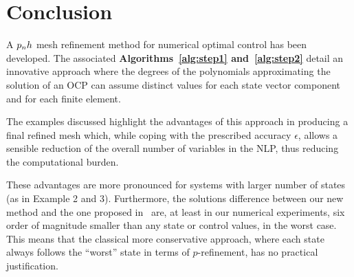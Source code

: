 \section*{Conclusion}
A $p_{n}h$ mesh refinement method for numerical optimal control has been developed. The associated {\bf Algorithms~\ref{alg:step1} and~\ref{alg:step2}} detail an innovative approach where the degrees of the polynomials approximating the solution of an OCP can assume distinct values for each state vector component and for each finite element.

The examples discussed highlight the advantages of this approach in producing a final refined mesh which, while coping with the prescribed accuracy $\epsilon$, allows a sensible reduction of the overall number of variables in the NLP, thus reducing the computational burden. 

These advantages are more pronounced for systems with larger number of states (as in Example 2 and 3).
Furthermore, the solutions difference between our new method and the one proposed in~\cite{Patterson:OCAM:2015} are, at least in our numerical experiments, six order of magnitude smaller than any state or control values, in the worst case. This means that the classical more conservative approach, where each state always follows the ``worst'' state in terms of $p$-refinement, has no practical justification.  